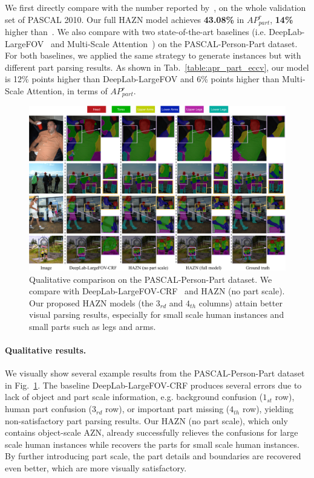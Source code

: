 We first directly compare with the number reported by~\cite{hariharan2015hypercolumns}, on the whole validation set of PASCAL 2010. Our full HAZN model achieves \textbf{43.08\%} in $AP^r_{part}$, \textbf{14\%} higher than~\cite{hariharan2015hypercolumns}. We also compare with two state-of-the-art baselines (i.e. DeepLab-LargeFOV~\cite{chen2016deeplab} and Multi-Scale Attention~\cite{chen2016attention}) on the PASCAL-Person-Part dataset. For both baselines, we applied the same strategy to generate instances but with different part parsing results. As shown in Tab.~\ref{table:apr_part_eccv}, our model is 12\% points higher than DeepLab-LargeFOV and 6\% points higher than Multi-Scale Attention, in terms of $AP^r_{part}$. 

\begin{figure}
\centering
\includegraphics[width=1.00\linewidth]{figs/results_v3_eccv.pdf}
\caption{Qualitative comparison on the PASCAL-Person-Part dataset. We compare with DeepLab-LargeFOV-CRF~\cite{chen2016deeplab} and HAZN (no part scale). Our proposed HAZN models (the $3_{rd}$ and $4_{th}$ columns) attain better visual parsing results, especially for small scale human instances and small parts such as legs and arms.}
\label{fig:seg_image_eccv}
\end{figure}

\paragraph{\textbf{Qualitative results.}} 
We visually show several example results from the PASCAL-Person-Part dataset in Fig.~\ref{fig:seg_image_eccv}. The baseline DeepLab-LargeFOV-CRF produces several errors due to lack of object and part scale information, e.g. background confusion ($1_{st}$ row), human part confusion ($3_{rd}$ row), or important part missing ($4_{th}$ row), yielding non-satisfactory part parsing results. Our HAZN (no part scale), which only contains object-scale AZN, already successfully relieves the confusions for large scale human instances while recovers the parts for small scale human instances. By further introducing part scale, the part details and boundaries are recovered even better, which are more visually satisfactory.

